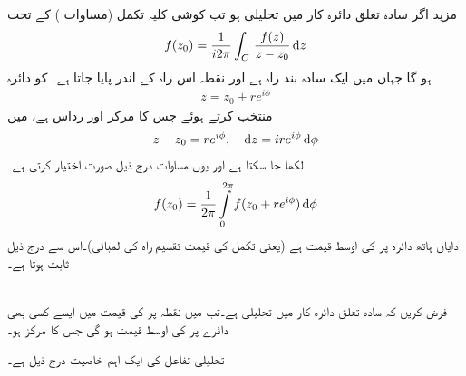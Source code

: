 مزید اگر سادہ تعلق دائرہ کار  میں  تحلیلی ہو تب کوشی کلیہ تکمل (مساوات ) کے تحت
\begin{align}\label{مساوات_مخلوط_مخفی_خواص_الف}
f(z_0)=\frac{1}{i2\pi}\int_C\,\frac{f(z)}{z-z_0}\dif z
\end{align}
ہو گا جہاں   میں  ایک سادہ بند راہ ہے اور نقطہ  اس راہ کے اندر پایا جاتا ہے۔ کو دائرہ
\begin{align*}
z=z_0+re^{i\phi}
\end{align*} 
 منتخب کرتے ہوئے جس کا مرکز  اور رداس  ہے،   میں 
\begin{align*}
z-z_0=re^{i\phi},\quad \dif z=ire^{i\phi}\dif \phi
\end{align*}
لکھا جا سکتا ہے اور یوں مساوات   درج ذیل صورت اختیار کرتی ہے۔
\begin{align}\label{مساوات_مخفی_قوہ_کوشی_تکمل_کلیہ_رداس_زاویہ_الف}
f(z_0)=\frac{1}{2\pi}\int\limits_0^{2\pi} f(z_0+re^{i\phi})\dif \phi
\end{align}
دایاں ہاتھ دائرہ  پر  کی اوسط قیمت ہے (یعنی تکمل کی قیمت تقسیم راہ کی لمبائی)۔اس سے درج ذیل ثابت ہوتا ہے۔

\quad {}\\
فرض کریں کہ سادہ تعلق دائرہ کار  میں  تحلیلی ہے۔تب  میں نقطہ  پر  کی قیمت  میں ایسے کسی بھی دائرے پر  کی اوسط قیمت ہو گی جس کا مرکز  ہو۔ 

تحلیلی تفاعل کی ایک اہم خاصیت درج ذیل ہے۔


